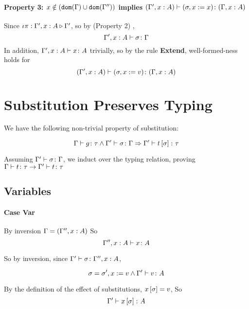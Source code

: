 {        \paragraph{Property 3: $x \notin (\texttt{dom}(\Gamma) \cup \texttt{dom}(\Gamma''))$ implies $(\Gamma', x: A) \vdash (\sigma, x := x) \colon (\Gamma, x: A)$} 
        Since $\iota\pi : \Gamma',x: A \triangleright \Gamma'$, so by (Property 2) , 
        $$\Gamma', x: A \vdash \sigma \colon \Gamma$$
        In addition, $\Gamma', x: A \vdash x \colon A$ trivially, so by the rule \textbf{Extend}, well-formed-ness holds for
        \begin{equation}
            (\Gamma', x:A) \vdash (\sigma, x:= v) \colon (\Gamma, x: A)
        \end{equation}
    

    \section{Substitution Preserves Typing}
    We have the following non-trivial property of substitution:

    \begin{equation}
        \Gamma \vdash g \colon \tau\wedge\Gamma' \vdash \sigma \colon \Gamma\Rightarrow\Gamma' \vdash t\left[\sigma\right] \colon \tau
    \end{equation}

    Assuming $\Gamma' \vdash \sigma \colon \Gamma$, we induct over the typing relation, proving $\Gamma \vdash t \colon \tau\rightarrow\Gamma' \vdash t \colon \tau$

    \subsection{Variables}  
        \paragraph{Case Var}
            By inversion $\Gamma = (\Gamma'', x:A)$
            So \begin{equation}
                \Gamma'',x:A \vdash x \colon A
            \end{equation}

            So by inversion, since $\Gamma' \vdash \sigma \colon \Gamma'', x:A$, 

            \begin{equation}
                \sigma = \sigma', x:= v \wedge \Gamma' \vdash v \colon A
            \end{equation}

            By the definition of the effect of substitutions, $x\left[\sigma\right] = v$, So
            \begin{equation}
                \Gamma' \vdash x\left[\sigma\right] \colon A
            \end{equation}

}
